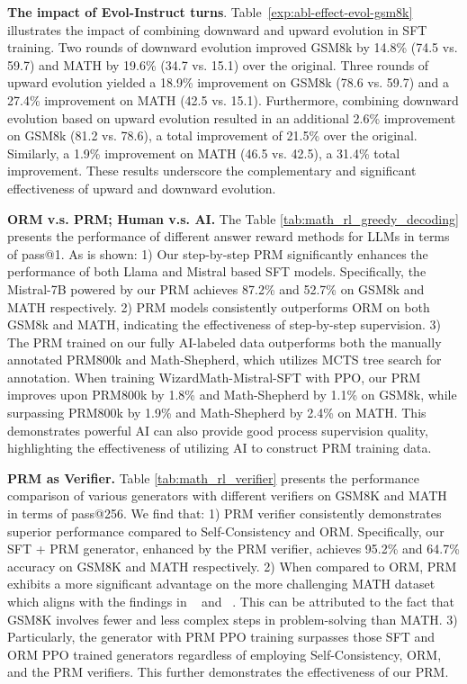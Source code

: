 \textbf{The impact of Evol-Instruct turns}. Table~\ref{exp:abl-effect-evol-gsm8k} illustrates the impact of combining downward and upward evolution in SFT training. Two rounds of downward evolution improved GSM8k by 14.8\% (74.5 vs. 59.7) and MATH by 19.6\% (34.7 vs. 15.1) over the original. Three rounds of upward evolution yielded a 18.9\% improvement on GSM8k (78.6 vs. 59.7) and a 27.4\% improvement on MATH (42.5 vs. 15.1). Furthermore,  combining downward evolution based on upward evolution resulted in an additional 2.6\% improvement on GSM8k (81.2 vs. 78.6), a total improvement of 21.5\% over the original. Similarly, a 1.9\% improvement on MATH (46.5 vs. 42.5), a 31.4\% total improvement. These results underscore the complementary and significant effectiveness of upward and downward evolution.

\textbf{ORM v.s. PRM; Human v.s. AI.} The Table \ref{tab:math_rl_greedy_decoding} presents the performance of different answer reward methods for LLMs in terms of pass@1. As is shown: 1) Our step-by-step PRM significantly enhances the performance of both Llama and Mistral based SFT models.  Specifically, the Mistral-7B powered by our PRM achieves 87.2\% and 52.7\% on GSM8k and MATH respectively. 2)  PRM models consistently outperforms ORM on both GSM8k and MATH, indicating the effectiveness of step-by-step supervision. 3) The PRM trained on our fully AI-labeled data  outperforms both the manually annotated PRM800k and Math-Shepherd, which utilizes MCTS tree search for annotation. When training WizardMath-Mistral-SFT with PPO, our PRM  improves upon PRM800k by 1.8\% and Math-Shepherd by 1.1\% on GSM8k, while surpassing PRM800k by 1.9\% and Math-Shepherd by 2.4\% on MATH. This demonstrates powerful AI can also provide good  process supervision quality, highlighting the effectiveness of utilizing AI to construct PRM training data. 

\textbf{PRM as Verifier.} Table \ref{tab:math_rl_verifier} presents the performance comparison of various generators with different verifiers on GSM8K and MATH in terms of pass@256. We find that: 1) PRM verifier consistently demonstrates superior performance compared to Self-Consistency and ORM. Specifically, our SFT + PRM generator, enhanced by the PRM verifier, achieves 95.2\% and 64.7\% accuracy on GSM8K and MATH respectively. 2) When compared to ORM, PRM exhibits a more significant advantage on the more challenging MATH dataset which aligns with the findings in ~\citep{uesato2022deepmind-orms} and ~\citep{lightman2023openai-verify-step-by-step}. This can be attributed to the fact that GSM8K involves fewer and less complex steps in problem-solving than MATH. 3) Particularly, the generator with PRM PPO training  surpasses those SFT and ORM PPO trained generators regardless of employing Self-Consistency, ORM, and the PRM verifiers. This further demonstrates the effectiveness of our PRM.

